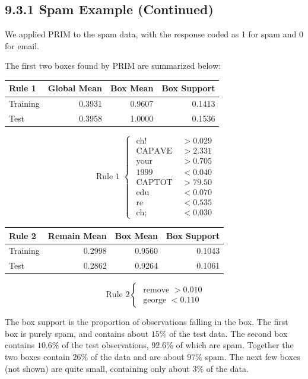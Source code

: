 \documentclass[10pt]{article}
\begin{document}
\subsection*{9.3.1 Spam Example (Continued)}
We applied PRIM to the spam data, with the response coded as 1 for spam and 0 for email.

The first two boxes found by PRIM are summarized below:

\begin{center}
\begin{tabular}{l|r|r|r|}
Rule 1 & Global Mean & Box Mean & Box Support \\
\hline
Training & 0.3931 & 0.9607 & 0.1413 \\
Test & 0.3958 & 1.0000 & 0.1536 \\
\hline
\end{tabular}
\end{center}

$$
\text { Rule 1 }\left\{\begin{aligned}
\text { ch! } & >0.029 \\
\text { CAPAVE } & >2.331 \\
\text { your } & >0.705 \\
\text { 1999 } & <0.040 \\
\text { CAPTOT } & >79.50 \\
\text { edu } & <0.070 \\
\text { re } & <0.535 \\
\text { ch; } & <0.030
\end{aligned}\right.
$$

\begin{center}
\begin{tabular}{l|r|r|r|}
Rule 2 & Remain Mean & Box Mean & Box Support \\
\hline
Training & 0.2998 & 0.9560 & 0.1043 \\
Test & 0.2862 & 0.9264 & 0.1061 \\
\hline
\end{tabular}
\end{center}

$$
\text { Rule } 2\left\{\begin{array}{l}
\text { remove }>0.010 \\
\text { george }<0.110
\end{array}\right.
$$

The box support is the proportion of observations falling in the box. The first box is purely spam, and contains about $15 \%$ of the test data. The second box contains $10.6 \%$ of the test observations, $92.6 \%$ of which are spam. Together the two boxes contain $26 \%$ of the data and are about $97 \%$ spam. The next few boxes (not shown) are quite small, containing only about $3 \%$ of the data.
\end{document}
